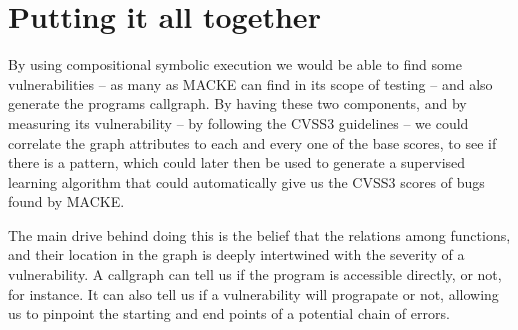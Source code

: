 \section{Putting it all together}

By using compositional symbolic execution we would be able to find some vulnerabilities -- as many as MACKE can find in its scope of testing -- and also generate the programs callgraph. By having these two components, and by measuring its vulnerability -- by following the CVSS3 guidelines -- we could correlate the graph attributes to each and every one of the base scores, to see if there is a pattern, which could later then be used to generate a supervised learning algorithm that could automatically give us the CVSS3 scores of bugs found by MACKE. 

The main drive behind doing this is the belief that the relations among functions, and their location in the graph is deeply intertwined with the severity of a vulnerability. A callgraph can tell us if the program is accessible directly, or not, for instance. It can also tell us if a vulnerability will prograpate or not, allowing us to pinpoint the starting and end points of a potential chain of errors.



